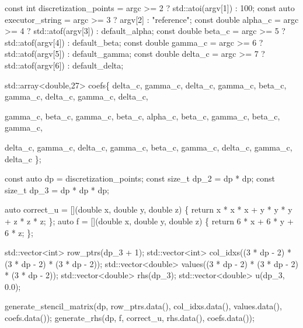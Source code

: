 \begin{DoxyCodeInclude}
    \textcolor{keyword}{const} \textcolor{keywordtype}{int} discretization\_points = argc >= 2 ? std::atoi(argv[1]) : 100;
    \textcolor{keyword}{const} \textcolor{keyword}{auto} executor\_string = argc >= 3 ? argv[2] : \textcolor{stringliteral}{"reference"};
    \textcolor{keyword}{const} \textcolor{keywordtype}{double} alpha\_c = argc >= 4 ? std::atof(argv[3]) : default\_alpha;
    \textcolor{keyword}{const} \textcolor{keywordtype}{double} beta\_c = argc >= 5 ? std::atof(argv[4]) : default\_beta;
    \textcolor{keyword}{const} \textcolor{keywordtype}{double} gamma\_c = argc >= 6 ? std::atof(argv[5]) : default\_gamma;
    \textcolor{keyword}{const} \textcolor{keywordtype}{double} delta\_c = argc >= 7 ? std::atof(argv[6]) : default\_delta;

    std::array<double,27> coefs\{
        delta\_c, gamma\_c, delta\_c,
        gamma\_c, beta\_c, gamma\_c,
        delta\_c, gamma\_c, delta\_c,

        gamma\_c, beta\_c,  gamma\_c,
        beta\_c,  alpha\_c, beta\_c,
        gamma\_c, beta\_c,  gamma\_c,

        delta\_c, gamma\_c, delta\_c,
        gamma\_c, beta\_c, gamma\_c,
        delta\_c, gamma\_c, delta\_c
    \};

    \textcolor{keyword}{const} \textcolor{keyword}{auto} dp = discretization\_points;
    \textcolor{keyword}{const} \textcolor{keywordtype}{size\_t} dp\_2 = dp * dp;
    \textcolor{keyword}{const} \textcolor{keywordtype}{size\_t} dp\_3 = dp * dp * dp;

    \textcolor{keyword}{auto} correct\_u = [](\textcolor{keywordtype}{double} x, \textcolor{keywordtype}{double} y, \textcolor{keywordtype}{double} z) \{
        \textcolor{keywordflow}{return} x * x * x + y * y * y + z * z * z;
    \};
    \textcolor{keyword}{auto} f = [](\textcolor{keywordtype}{double} x, \textcolor{keywordtype}{double} y, \textcolor{keywordtype}{double} z) \{ \textcolor{keywordflow}{return} 6 * x + 6 * y + 6 * z; \};

    std::vector<int> row\_ptrs(dp\_3 + 1);
    std::vector<int> col\_idxs((3 * dp - 2) * (3 * dp - 2) * (3 * dp - 2));
    std::vector<double> values((3 * dp - 2) * (3 * dp - 2) * (3 * dp - 2));
    std::vector<double> rhs(dp\_3);
    std::vector<double> u(dp\_3, 0.0);

    generate\_stencil\_matrix(dp, row\_ptrs.data(), col\_idxs.data(), values.data(),
                            coefs.data());
    generate\_rhs(dp, f, correct\_u, rhs.data(), coefs.data());


\end{DoxyCodeInclude}
